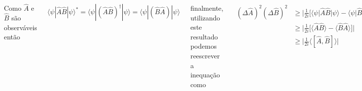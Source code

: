\documentclass[12pt,brazil,table]{beamer}
\begin{document}
\begin{frame}
\begin{columns}[T]
  Como $\hat{A}$ e $\hat{B}$ são observáveis então
  
  \[
   \langle\psi|\hat{A}\hat{B}|\psi\rangle^*=\langle\psi|(\hat{A}\hat{B})^{\dagger}|\psi\rangle=\langle\psi|(\hat{B}\hat{A})|\psi\rangle
  \]
  
  finalmente, utilizando este resultado podemos reescrever a inequação como
  
  \begin{align*}
   ({\Delta\hat{A}})^2({\Delta\hat{B}})^2 & \geqslant \Big|\frac{1}{2i}\Big[\langle\psi|\hat{A}\hat{B}\Big|\psi\rangle - \langle\psi \Big|\hat{B}\hat{A}\Big|\psi\rangle \Big]\Big|\\
   &\geqslant \Big|\frac{1}{2i}\Big[\langle\hat{A}\hat{B}\rangle - \langle\hat{B}\hat{A}\rangle \Big] \Big|\\
   &\geqslant \Big|\frac{1}{2i}\langle[\hat{A},\hat{B}]\rangle\Big|
  \end{align*}

  de forma que a relação de dispersão para qualquer par de operadores hermitiano está relacionado com seu comutador via
  
  \[
   ({\Delta\hat{A}})^2({\Delta\hat{B}})^2 \geqslant \Big|\frac{1}{2i}\langle[\hat{A},\hat{B}]\rangle \Big|
  \]

  ou seja, se dois operadores comutam então podem ser medidos simultaneamente com precisão absoluta, caso não comutem a precisão da medida tem uma cota superior
   
  \end{columns}
\end{frame}



  
\end{document}
